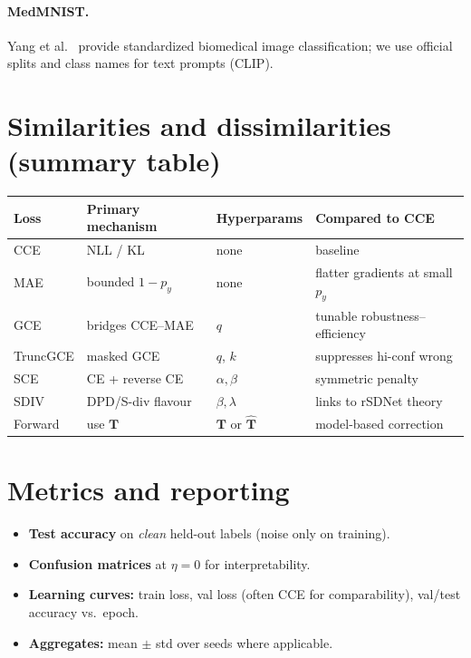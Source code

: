 \documentclass[11pt,a4paper]{article}
\begin{document}
\paragraph{MedMNIST.}
Yang et al.\ \cite{yang2023medmnist} provide standardized biomedical image classification; we use official splits and class names for text prompts (CLIP).

\section{Similarities and dissimilarities (summary table)}

\begin{table}[h]
\centering
\small
\begin{tabular}{@{}p{2.2cm}p{3.2cm}p{3.5cm}p{4.5cm}@{}}
\toprule
\textbf{Loss} & \textbf{Primary mechanism} & \textbf{Hyperparams} & \textbf{Compared to CCE} \\
\midrule
CCE & NLL / KL & none & baseline \\
MAE & bounded $1-p_y$ & none & flatter gradients at small $p_y$ \\
GCE & bridges CCE--MAE & $q$ & tunable robustness--efficiency \\
TruncGCE & masked GCE & $q$, $k$ & suppresses hi-conf wrong \\
SCE & CE + reverse CE & $\alpha,\beta$ & symmetric penalty \\
SDIV & DPD/S-div flavour & $\beta,\lambda$ & links to rSDNet theory \\
Forward & use $\mathbf{T}$ & $\mathbf{T}$ or $\hat{\mathbf{T}}$ & model-based correction \\
\bottomrule
\end{tabular}
\end{table}

\section{Metrics and reporting}

\begin{itemize}[leftmargin=*]
  \item \textbf{Test accuracy} on \emph{clean} held-out labels (noise only on training).
  \item \textbf{Confusion matrices} at $\eta=0$ for interpretability.
  \item \textbf{Learning curves:} train loss, val loss (often CCE for comparability), val/test accuracy vs.\ epoch.
  \item \textbf{Aggregates:} mean $\pm$ std over seeds where applicable.
\end{itemize}
\end{document}
